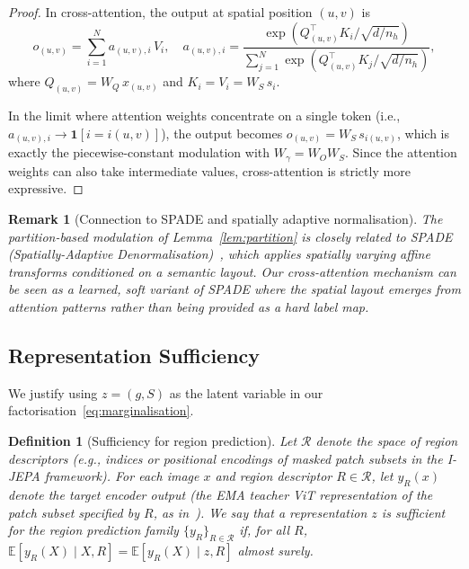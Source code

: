 \documentclass[12pt]{article}
\newtheorem{definition}[theorem]{Definition}
\newtheorem{remark}[theorem]{Remark}
\begin{document}
\begin{proof}
In cross-attention, the output at spatial position $(u,v)$ is
\begin{equation}\label{eq:xattn-output}
    o_{(u,v)} = \sum_{i=1}^{N} a_{(u,v),i}\, V_i,
    \quad
    a_{(u,v),i} = \frac{\exp(Q_{(u,v)}^\top K_i / \sqrt{d/n_h})}
    {\sum_{j=1}^{N} \exp(Q_{(u,v)}^\top K_j / \sqrt{d/n_h})},
\end{equation}
where $Q_{(u,v)} = W_Q\, x_{(u,v)}$ and $K_i = V_i = W_S\, s_i$.

In the limit where attention weights concentrate on a single token
(i.e., $a_{(u,v),i} \to \mathbf{1}[i = i(u,v)]$), the output becomes
$o_{(u,v)} = W_S\, s_{i(u,v)}$, which is exactly the piecewise-constant
modulation with $W_\gamma = W_O W_S$.
Since the attention weights can also take intermediate values,
cross-attention is strictly more expressive.
\end{proof}

\begin{remark}[Connection to SPADE and spatially adaptive normalisation]
\label{rem:spade}
The partition-based modulation of Lemma~\ref{lem:partition} is
closely related to SPADE (Spatially-Adaptive Denormalisation)~\cite{park2019spade},
which applies spatially varying affine transforms conditioned on a
semantic layout.
Our cross-attention mechanism can be seen as a \emph{learned, soft}
variant of SPADE where the spatial layout emerges from attention
patterns rather than being provided as a hard label map.
\end{remark}

\subsection{Representation Sufficiency}
\label{sec:sufficiency}

We justify using $z = (g, S)$ as the latent variable in our
factorisation~\eqref{eq:marginalisation}.

\begin{definition}[Sufficiency for region prediction]
\label{def:sufficiency}
Let $\mathcal{R}$ denote the space of region descriptors (e.g., indices
or positional encodings of masked patch subsets in the I-JEPA framework).
For each image $x$ and region descriptor $R \in \mathcal{R}$,
let $y_R(x)$ denote the \emph{target encoder} output
(the EMA teacher ViT representation of the patch subset specified by $R$,
as in~\cite{assran2023ijepa}).
We say that a representation $z$ is \emph{sufficient for the region
prediction family} $\{y_R\}_{R \in \mathcal{R}}$ if, for all $R$,
$\mathbb{E}[y_R(X) \mid X, R] = \mathbb{E}[y_R(X) \mid z, R]$
almost surely.
\end{definition}
\end{document}

